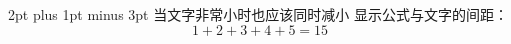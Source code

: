 \setlength{\abovedisplayskip}%
  {2pt plus 1pt minus 3pt}
当文字非常小时也应该同时减小
显示公式与文字的间距：
\[ 1+2+3+4+5 = 15 \]
